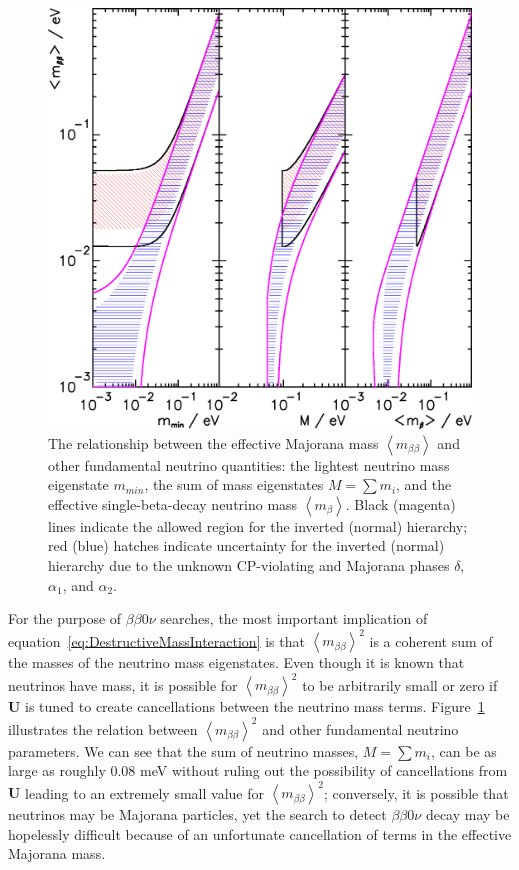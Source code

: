 \begin{figure}
\begin{center}
\includegraphics[keepaspectratio=true,width=\textwidth]{PDGNeutrinoMassBounds.eps}
\end{center}
\caption{The relationship between the effective Majorana mass $\left<m_{\beta\beta}\right>$ and other fundamental neutrino quantities: the lightest neutrino mass eigenstate $m_{min}$, the sum of mass eigenstates $M = \sum m_i$, and the effective single-beta-decay neutrino mass $\left<m_{\beta}\right>$.  Black (magenta) lines indicate the allowed region for the inverted (normal) hierarchy; red (blue) hatches indicate uncertainty for the inverted (normal) hierarchy due to the unknown CP-violating and Majorana phases $\delta$, $\alpha_1$, and $\alpha_2$.~\cite{PDG}}
\label{fig:NeutrinoMassBounds}
\end{figure}

For the purpose of $\beta\beta 0\nu$ searches, the most important implication of equation~\ref{eq:DestructiveMassInteraction} is that $\left< m_{\beta\beta}\right>^2$ is a coherent sum of the masses of the neutrino mass eigenstates.  Even though it is known that neutrinos have mass, it is possible for $\left< m_{\beta\beta}\right>^2$ to be arbitrarily small or zero if $\mathbf{U}$ is tuned to create cancellations between the neutrino mass terms.  Figure~\ref{fig:NeutrinoMassBounds} illustrates the relation between $\left< m_{\beta\beta}\right>^2$ and other fundamental neutrino parameters.  We can see that the sum of neutrino masses, $M = \sum m_i$, can be as large as roughly $0.08$ meV without ruling out the possibility of cancellations from $\mathbf{U}$ leading to an extremely small value for $\left< m_{\beta\beta}\right>^2$; conversely, it is possible that neutrinos may be Majorana particles, yet the search to detect $\beta\beta 0\nu$ decay may be hopelessly difficult because of an unfortunate cancellation of terms in the effective Majorana mass.

